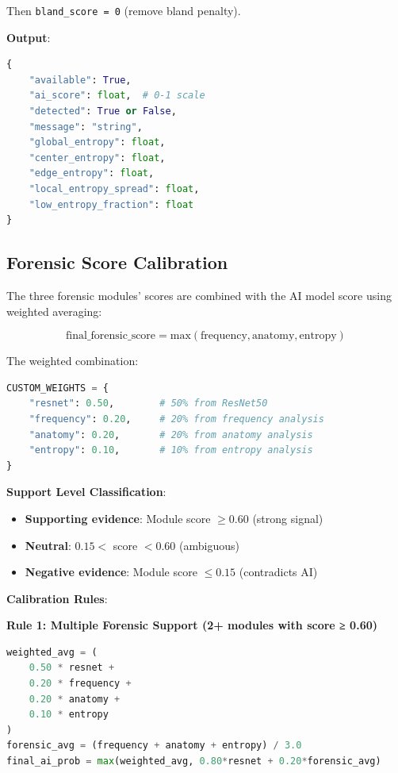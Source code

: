 \documentclass[12pt,a4paper]{book}
\begin{document}
Then \texttt{bland\_score = 0} (remove bland penalty).

\textbf{Output}:
\begin{lstlisting}[language=Python]
{
    "available": True,
    "ai_score": float,  # 0-1 scale
    "detected": True or False,
    "message": "string",
    "global_entropy": float,
    "center_entropy": float,
    "edge_entropy": float,
    "local_entropy_spread": float,
    "low_entropy_fraction": float
}
\end{lstlisting}

\subsection{Forensic Score Calibration}
\label{subsec:forensic-calib}

The three forensic modules' scores are combined with the AI model score using weighted averaging:

\begin{equation}
\text{final\_forensic\_score} = \text{max}(\text{frequency}, \text{anatomy}, \text{entropy})
\end{equation}

The weighted combination:

\begin{lstlisting}[language=Python]
CUSTOM_WEIGHTS = {
    "resnet": 0.50,        # 50% from ResNet50
    "frequency": 0.20,     # 20% from frequency analysis
    "anatomy": 0.20,       # 20% from anatomy analysis
    "entropy": 0.10,       # 10% from entropy analysis
}
\end{lstlisting}

\textbf{Support Level Classification}:

\begin{itemize}
    \item \textbf{Supporting evidence}: Module score $\geq 0.60$ (strong signal)
    \item \textbf{Neutral}: $0.15 < $ score $< 0.60$ (ambiguous)
    \item \textbf{Negative evidence}: Module score $\leq 0.15$ (contradicts AI)
\end{itemize}

\textbf{Calibration Rules}:

\textbf{Rule 1: Multiple Forensic Support (2+ modules with score ≥ 0.60)}

\begin{lstlisting}[language=Python]
weighted_avg = (
    0.50 * resnet +
    0.20 * frequency +
    0.20 * anatomy +
    0.10 * entropy
)
forensic_avg = (frequency + anatomy + entropy) / 3.0
final_ai_prob = max(weighted_avg, 0.80*resnet + 0.20*forensic_avg)
\end{lstlisting}
\end{document}
